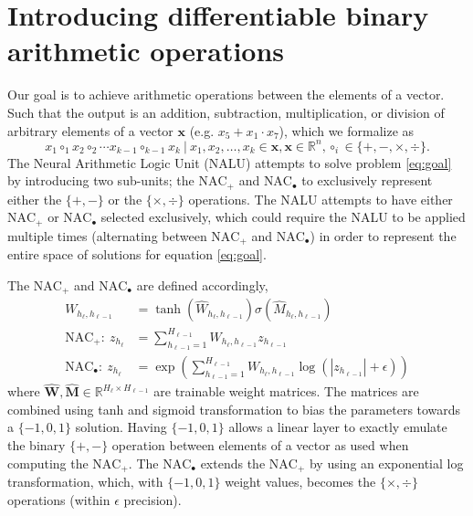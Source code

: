 \section{Introducing differentiable binary arithmetic operations}
\label{sec:Nalu}
Our goal is to achieve arithmetic operations between the elements of a vector. Such that the output is an addition, subtraction, multiplication, or division of arbitrary elements of a vector $\mathbf{x}$ (e.g. ${x_5 + x_1 \cdot x_7}$), which we formalize as
\begin{equation}
x_1\circ_1 x_2 \circ_2 \cdots x_{k-1} \circ_{k-1} x_{k}\ |\ x_1, x_2, \dots, x_k \in \mathbf{x}, \mathbf{x} \in \mathbb{R}^n, \circ_i \in \{+, -, \times, \div \}.
\label{eq:goal}
\end{equation}
The Neural Arithmetic Logic Unit (NALU) \cite{trask-nalu} attempts to solve problem \ref{eq:goal} by introducing two sub-units; the $\text{NAC}_{+}$ and $\text{NAC}_{\bullet}$ to exclusively represent either the $\{+, -\}$ or the $\{\times, \div \}$ operations.
The NALU attempts to have either $\text{NAC}_{+}$ or $\text{NAC}_{\bullet}$ selected exclusively, which could require the NALU to be applied multiple times (alternating between $\text{NAC}_{+}$ and $\text{NAC}_{\bullet}$) in order to represent the entire space of solutions for equation \ref{eq:goal}.

The $\text{NAC}_{+}$ and $\text{NAC}_{\bullet}$ are defined accordingly,
\begin{align}
W_{h_\ell, h_{\ell-1}} &= \tanh(\hat{W}_{h_\ell, h_{\ell-1}}) \sigma(\hat{M}_{h_\ell, h_{\ell-1}}) \label{eq:weight}\\
\textrm{NAC}_+:\ z_{h_\ell} &= \sum_{h_{\ell-1}=1}^{H_{\ell-1}} W_{h_{\ell}, h_{\ell-1}} z_{h_{\ell-1}} \label{eq:naca}\\
\textrm{NAC}_\bullet:\ z_{h_\ell} &= \exp\left(\sum_{h_{\ell-1}=1}^{H_{\ell-1}} W_{h_{\ell}, h_{\ell-1}} \label{eq:nacm}\log(|z_{h_{\ell-1}}| + \epsilon) \right)
\end{align}
where $\hat{\mathbf{W}}, \hat{\mathbf{M}} \in \mathbb{R}^{H_{\ell} \times H_{\ell-1}}$ are trainable weight matrices. The matrices are combined using tanh and sigmoid transformation to bias the parameters towards a $\{-1,0,1\}$ solution. Having $\{-1,0,1\}$ allows a linear layer to exactly emulate the binary $\{+, -\}$ operation between elements of a vector as used when computing the $\text{NAC}_{+}$.
The $\text{NAC}_{\bullet}$ extends the $\text{NAC}_{+}$ by using an exponential log transformation, which, with $\{-1,0,1\}$ weight values, becomes the $\{\times, \div \}$ operations (within $\epsilon$ precision).

